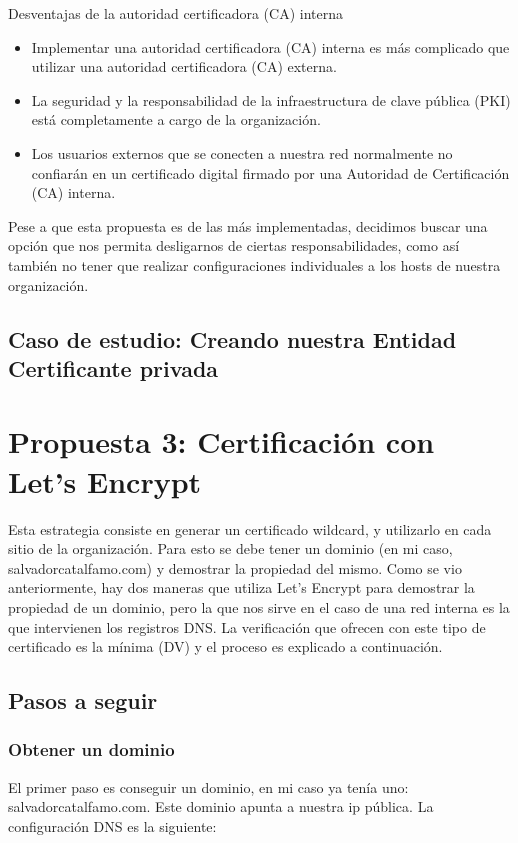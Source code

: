 Desventajas de la autoridad certificadora (CA) interna

\begin{itemize}
   \setlength\itemsep{-0.6em}
   \item Implementar una autoridad certificadora (CA) interna es más complicado que utilizar una 
   autoridad certificadora (CA) externa.
   \item La seguridad y la responsabilidad de la infraestructura de clave pública (PKI) está 
   completamente a cargo de la organización.
   \item Los usuarios externos que se conecten a nuestra red normalmente no confiarán en un 
   certificado digital 
   firmado por una Autoridad de Certificación (CA) interna.

\end{itemize}

Pese a que esta propuesta es de las más implementadas, decidimos buscar una opción que nos 
permita desligarnos de ciertas responsabilidades, como así también no tener que realizar 
configuraciones individuales a los hosts de nuestra organización. 

\subsection{Caso de estudio: Creando nuestra Entidad Certificante privada}



\section{Propuesta 3: Certificación con Let's Encrypt}
Esta estrategia consiste en generar un certificado wildcard, y utilizarlo en cada sitio de la organización.
Para esto se debe tener un dominio (en mi caso, salvadorcatalfamo.com) y demostrar la propiedad 
del mismo. Como se vio anteriormente, hay dos maneras que utiliza Let's Encrypt para demostrar la propiedad 
de un dominio, pero la que nos sirve en el caso de una red interna es la que intervienen los registros DNS. 
La verificación que ofrecen con este tipo de certificado es la mínima (DV) y el proceso es explicado a 
continuación.


\subsection{Pasos a seguir}
\subsubsection*{Obtener un dominio}
El primer paso es conseguir un dominio, en mi caso ya tenía uno:
salvadorcatalfamo.com. Este dominio apunta a nuestra ip pública. La configuración DNS
es la siguiente:  


